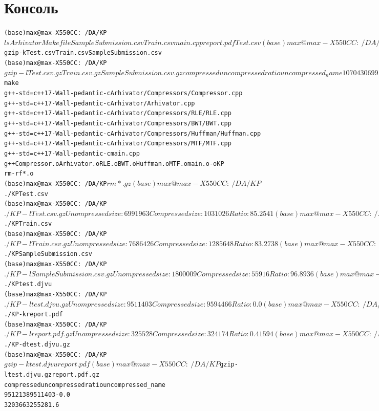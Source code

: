 \section{Консоль}
\begin{alltt}
(base) max@max-X550CC:~/DA/KP$ ls
Arhivator  Makefile    SampleSubmission.csv  Train.csv
main.cpp   report.pdf  Test.csv
(base) max@max-X550CC:~/DA/KP$ gzip -k Test.csv Train.csv SampleSubmission.csv 
(base) max@max-X550CC:~/DA/KP$ gzip -l Test.csv.gz Train.csv.gz SampleSubmission.csv.gz 
         compressed        uncompressed  ratio uncompressed_name
            1070430             6991963  84.7%
            1403853             7686426  81.7%
             251796             1800009  86.0%
            2726079            16478398  83.5%
(base) max@max-X550CC:~/DA/KP$ make
g++ -std=c++17 -Wall -pedantic -c Arhivator/Compressors/Compressor.cpp
g++ -std=c++17 -Wall -pedantic -c Arhivator/Arhivator.cpp
g++ -std=c++17 -Wall -pedantic -c Arhivator/Compressors/RLE/RLE.cpp
g++ -std=c++17 -Wall -pedantic -c Arhivator/Compressors/BWT/BWT.cpp
g++ -std=c++17 -Wall -pedantic -c Arhivator/Compressors/Huffman/Huffman.cpp
g++ -std=c++17 -Wall -pedantic -c Arhivator/Compressors/MTF/MTF.cpp
g++ -std=c++17 -Wall -pedantic -c main.cpp
g++ Compressor.o Arhivator.o RLE.o BWT.o Huffman.o MTF.o main.o -o KP
rm -rf *.o
(base) max@max-X550CC:~/DA/KP$ rm *.gz
(base) max@max-X550CC:~/DA/KP$ ./KP Test.csv 
(base) max@max-X550CC:~/DA/KP$ ./KP -l Test.csv.gz 
Unompressed size: 6991963
Compressed size: 1031026
Ratio: 85.2541%
(base) max@max-X550CC:~/DA/KP$ ./KP Train.csv  
(base) max@max-X550CC:~/DA/KP$ ./KP -l Train.csv.gz  
Unompressed size: 7686426
Compressed size: 1285648
Ratio: 83.2738%
(base) max@max-X550CC:~/DA/KP$ ./KP SampleSubmission.csv  
(base) max@max-X550CC:~/DA/KP$ ./KP -l SampleSubmission.csv.gz  
Unompressed size: 1800009
Compressed size: 55916
Ratio: 96.8936%
(base) max@max-X550CC:~/DA/KP$ ./KP test.djvu 
(base) max@max-X550CC:~/DA/KP$ ./KP -l test.djvu.gz 
Unompressed size: 9511403
Compressed size: 9594466
Ratio: 0.0%
(base) max@max-X550CC:~/DA/KP$ ./KP -k report.pdf 
(base) max@max-X550CC:~/DA/KP$ ./KP -l report.pdf.gz 
Unompressed size: 325528
Compressed size: 324174
Ratio: 0.41594%
(base) max@max-X550CC:~/DA/KP$ ./KP -d test.djvu.gz 
(base) max@max-X550CC:~/DA/KP$ gzip -k test.djvu report.pdf 
(base) max@max-X550CC:~/DA/KP$ gzip -l test.djvu.gz report.pdf.gz 
         compressed        uncompressed  ratio uncompressed_name
            9512138             9511403  -0.0%
             320366              325528   1.6%

\end{alltt}
